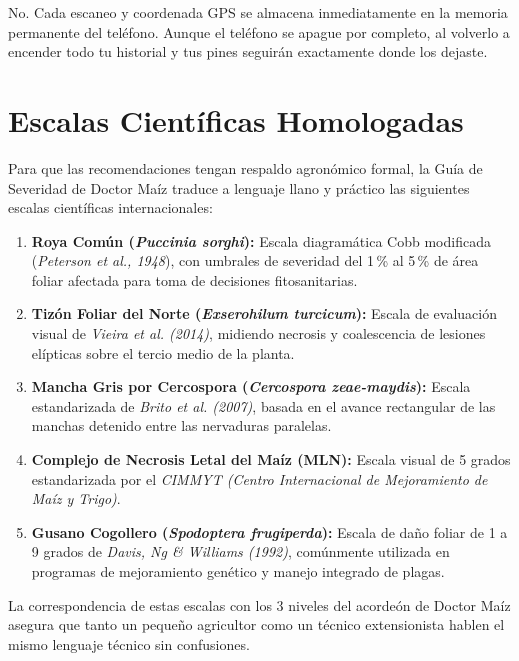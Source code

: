 \documentclass[11pt,a4paper]{report}
\begin{document}
\vspace{1.5mm}
\begin{tcolorbox}[
    enhanced,
    colback=white,
    colframe=MaizPrimary,
    arc=2mm,
    boxrule=1pt,
    title={\textbf{¿Se pierden mis escaneos si se me apaga la batería por completo?}},
    fonttitle=\sffamily\bfseries\color{white},
    colbacktitle=MaizPrimary,
    top=3mm, bottom=3mm, left=4mm, right=4mm
]
    No. Cada escaneo y coordenada GPS se almacena inmediatamente en la memoria permanente del teléfono. Aunque el teléfono se apague por completo, al volverlo a encender todo tu historial y tus pines seguirán exactamente donde los dejaste.
\end{tcolorbox}

\appendix
\chapter{Escalas Científicas Homologadas}

Para que las recomendaciones tengan respaldo agronómico formal, la Guía de Severidad de Doctor Maíz traduce a lenguaje llano y práctico las siguientes escalas científicas internacionales:

\begin{enumerate}[leftmargin=1.5em,itemsep=4pt]
    \item \textbf{Roya Común (\textit{Puccinia sorghi}):} Escala diagramática Cobb modificada (\textit{Peterson et al., 1948}), con umbrales de severidad del 1\,\% al 5\,\% de área foliar afectada para toma de decisiones fitosanitarias.
    \item \textbf{Tizón Foliar del Norte (\textit{Exserohilum turcicum}):} Escala de evaluación visual de \textit{Vieira et al. (2014)}, midiendo necrosis y coalescencia de lesiones elípticas sobre el tercio medio de la planta.
    \item \textbf{Mancha Gris por Cercospora (\textit{Cercospora zeae-maydis}):} Escala estandarizada de \textit{Brito et al. (2007)}, basada en el avance rectangular de las manchas detenido entre las nervaduras paralelas.
    \item \textbf{Complejo de Necrosis Letal del Maíz (MLN):} Escala visual de 5 grados estandarizada por el \textit{CIMMYT (Centro Internacional de Mejoramiento de Maíz y Trigo)}.
    \item \textbf{Gusano Cogollero (\textit{Spodoptera frugiperda}):} Escala de daño foliar de 1 a 9 grados de \textit{Davis, Ng \& Williams (1992)}, comúnmente utilizada en programas de mejoramiento genético y manejo integrado de plagas.
\end{enumerate}

\vspace{4mm}
\begin{campotip}
    La correspondencia de estas escalas con los 3 niveles del acordeón de Doctor Maíz asegura que tanto un pequeño agricultor como un técnico extensionista hablen el mismo lenguaje técnico sin confusiones.
\end{campotip}
\end{document}
